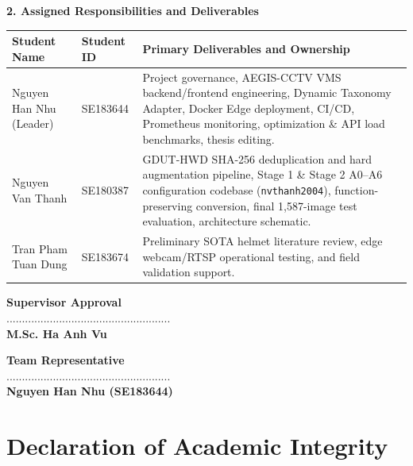 \clearpage
\noindent\textbf{2. Assigned Responsibilities and Deliverables}
\begin{table}[H]
\centering
\small
\renewcommand{\arraystretch}{1.22}
\begin{tabularx}{\textwidth}{|>{\raggedright\arraybackslash}p{3.6cm}|>{\raggedright\arraybackslash}p{2.2cm}|>{\raggedright\arraybackslash}X|}
\hline
\rowcolor{slatehdr}
\textbf{Student Name} & \textbf{Student ID} & \textbf{Primary Deliverables and Ownership} \\
\hline
Nguyen Han Nhu (Leader) & SE183644 & Project governance, AEGIS-CCTV VMS backend/frontend engineering, Dynamic Taxonomy Adapter, Docker Edge deployment, CI/CD, Prometheus monitoring, optimization \& API load benchmarks, thesis editing. \\
\hline
Nguyen Van Thanh & SE180387 & GDUT-HWD SHA-256 deduplication and hard augmentation pipeline, Stage 1 \& Stage 2 A0--A6 configuration codebase (\texttt{nvthanh2004}), function-preserving conversion, final 1,587-image test evaluation, architecture schematic. \\
\hline
Tran Pham Tuan Dung & SE183674 & Preliminary SOTA helmet literature review, edge webcam/RTSP operational testing, and field validation support. \\
\hline
\end{tabularx}
\end{table}

\vspace{16pt}
\noindent
\begin{minipage}[t]{0.46\textwidth}
\centering
\textbf{Supervisor Approval}\\[28pt]
.....................................................\\
\textbf{M.Sc. Ha Anh Vu}
\end{minipage}
\hfill
\begin{minipage}[t]{0.46\textwidth}
\centering
\textbf{Team Representative}\\[28pt]
.....................................................\\
\textbf{Nguyen Han Nhu (SE183644)}
\end{minipage}

\clearpage
\section*{Declaration of Academic Integrity}

